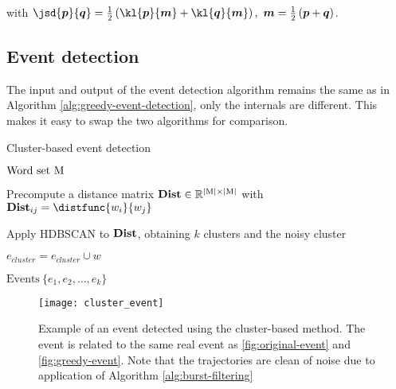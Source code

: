 with $\jsd{\vect{p}}{\vect{q}} = \frac{1}{2} \left( \kl{\vect{p}}{\vect{m}} + \kl{\vect{q}}{\vect{m}} \right) ,\ \vect{m} = \frac{1}{2} \left( \vect{p} + \vect{q} \right)$.


\subsection{Event detection}
The input and output of the event detection algorithm remains the same as in Algorithm \ref{alg:greedy-event-detection}, only the internals are different. This makes it easy to swap the two algorithms for comparison.

\begin{algorithm}[H]
\begin{algorithmic}[1]
\caption{Cluster-based event detection}
\Input $\text{Word set} ~ \text{M}$

\State Precompute a distance matrix $\mathbf{Dist} \in \mathbb{R}^{\left\vert \text{M} \right\vert \times \left\vert \text{M} \right\vert}$ with $\distmat_{ij} = \distfunc{w_{i}}{w_{j}}$

\State Apply HDBSCAN to $\mathbf{Dist}$, obtaining $k$ clusters and the noisy cluster

		\State $e_{cluster} = e_{cluster} \cup w$
	\EndIf
\EndFor

\Output $\text{Events} ~ \{ e_{1}, e_{2}, \dots, e_{k} \}$
\end{algorithmic}
\end{algorithm}


\begin{figure}[H]
  \centering
  \texttt{[image: cluster\_event]}  %
  \caption{Example of an event detected using the cluster-based method. The event is related to the same real event as \autoref{fig:original-event} and \autoref{fig:greedy-event}. Note that the trajectories are clean of noise due to application of Algorithm \ref{alg:burst-filtering}}
  \label{fig:cluster-event}
\end{figure}
